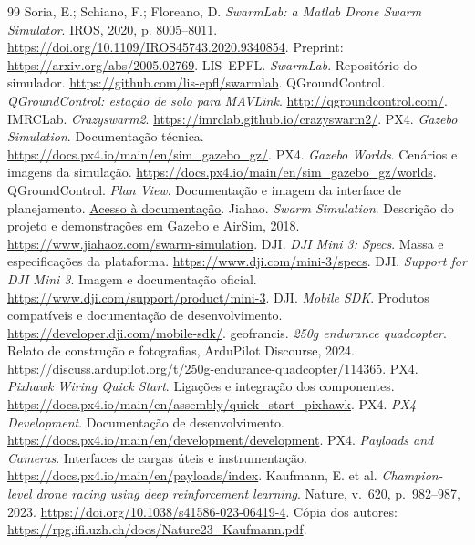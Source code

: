 \documentclass[11pt,a4paper,oneside]{book}
\numberwithin{equation}{chapter}
\begin{document}
\begin{thebibliography}{99}
 Soria, E.; Schiano, F.; Floreano, D. \emph{SwarmLab: a Matlab Drone Swarm Simulator}. IROS, 2020, p. 8005--8011. \url{https://doi.org/10.1109/IROS45743.2020.9340854}. Preprint: \url{https://arxiv.org/abs/2005.02769}.
 LIS--EPFL. \emph{SwarmLab}. Repositório do simulador. \url{https://github.com/lis-epfl/swarmlab}.
 QGroundControl. \emph{QGroundControl: estação de solo para MAVLink}. \url{http://qgroundcontrol.com/}.
 IMRCLab. \emph{Crazyswarm2}. \url{https://imrclab.github.io/crazyswarm2/}.
 PX4. \emph{Gazebo Simulation}. Documentação técnica. \url{https://docs.px4.io/main/en/sim_gazebo_gz/}.
 PX4. \emph{Gazebo Worlds}. Cenários e imagens da simulação. \url{https://docs.px4.io/main/en/sim_gazebo_gz/worlds}.
 QGroundControl. \emph{Plan View}. Documentação e imagem da interface de planejamento. \href{https://docs.qgroundcontrol.com/master/en/qgc-user-guide/plan_view/plan_view.html}{Acesso à documentação}.
 Jiahao. \emph{Swarm Simulation}. Descrição do projeto e demonstrações em Gazebo e AirSim, 2018. \url{https://www.jiahaoz.com/swarm-simulation}.
 DJI. \emph{DJI Mini 3: Specs}. Massa e especificações da plataforma. \url{https://www.dji.com/mini-3/specs}.
 DJI. \emph{Support for DJI Mini 3}. Imagem e documentação oficial. \url{https://www.dji.com/support/product/mini-3}.
 DJI. \emph{Mobile SDK}. Produtos compatíveis e documentação de desenvolvimento. \url{https://developer.dji.com/mobile-sdk/}.
 geofrancis. \emph{250g endurance quadcopter}. Relato de construção e fotografias, ArduPilot Discourse, 2024. \url{https://discuss.ardupilot.org/t/250g-endurance-quadcopter/114365}.
 PX4. \emph{Pixhawk Wiring Quick Start}. Ligações e integração dos componentes. \url{https://docs.px4.io/main/en/assembly/quick_start_pixhawk}.
 PX4. \emph{PX4 Development}. Documentação de desenvolvimento. \url{https://docs.px4.io/main/en/development/development}.
 PX4. \emph{Payloads and Cameras}. Interfaces de cargas úteis e instrumentação. \url{https://docs.px4.io/main/en/payloads/index}.
 Kaufmann, E. et al. \emph{Champion-level drone racing using deep reinforcement learning}. Nature, v.~620, p.~982--987, 2023. \url{https://doi.org/10.1038/s41586-023-06419-4}. Cópia dos autores: \url{https://rpg.ifi.uzh.ch/docs/Nature23_Kaufmann.pdf}.
\end{thebibliography}
\end{document}
